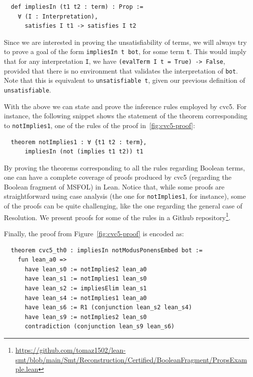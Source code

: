 \begin{verbatim}
  def impliesIn (t1 t2 : term) : Prop :=
    ∀ (I : Interpretation),
      satisfies I t1 -> satisfies I t2
\end{verbatim}

Since we are interested in proving the unsatisfiability of terms, we will always try to prove a goal of the form \texttt{impliesIn t bot}, for some term \texttt{t}. This would imply that for any interpretation \texttt{I}, we have \texttt{(evalTerm I t = True) -> False}, provided that there is no environment that validates the interpretation of \texttt{bot}. Note that this is equivalent to \texttt{unsatisfiable t}, given our previous definition of \texttt{unsatisfiable}.

With the above we can state and prove the inference rules employed by cvc5.
%
For instance, the following snippet shows the statement of the theorem corresponding
to \texttt{notImplies1}, one of the rules of the proof in~\ref{fig:cvc5-proof}:

\begin{verbatim}
  theorem notImplies1 : ∀ {t1 t2 : term},
      impliesIn (not (implies t1 t2)) t1
\end{verbatim}

By proving the theorems corresponding to all the rules regarding Boolean terms, one can have a
complete coverage of proofs produced by cvc5 (regarding the Boolean fragment of MSFOL) in Lean.
Notice that, while some proofs are straightforward using case analysis (the one for
\texttt{notImplies1}, for instance),
some of the proofs can be quite challenging, like the one regarding the general
case of Resolution. We present proofs for some of the rules in a Github repository\footnote{\url{https://github.com/tomaz1502/lean-smt/blob/main/Smt/Reconstruction/Certified/BooleanFragment/PropsExample.lean}}.

Finally, the proof from Figure~\ref{fig:cvc5-proof} is encoded as:

\begin{verbatim}
  theorem cvc5_th0 : impliesIn notModusPonensEmbed bot :=
    fun lean_a0 =>
      have lean_s0 := notImplies2 lean_a0
      have lean_s1 := notImplies1 lean_s0
      have lean_s2 := impliesElim lean_s1
      have lean_s4 := notImplies1 lean_a0
      have lean_s6 := R1 (conjunction lean_s2 lean_s4)
      have lean_s9 := notImplies2 lean_s0
      contradiction (conjunction lean_s9 lean_s6)
\end{verbatim}

